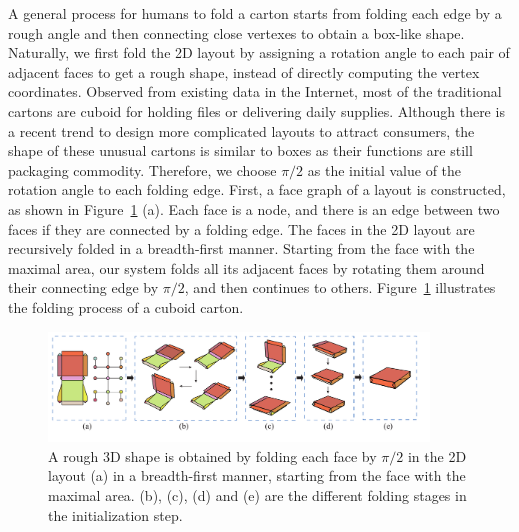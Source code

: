 


A general process for humans to fold a carton starts from folding each edge by a rough angle and then connecting close vertexes to obtain a box-like shape. 
Naturally, we first fold the 2D layout by assigning a rotation angle to each pair of adjacent faces to get a rough shape, instead of directly computing the vertex coordinates.
%	
Observed from existing data in the Internet, most of the traditional cartons are cuboid for holding files or delivering daily supplies. 
Although there is a recent trend to design more complicated layouts to attract consumers, the shape of these unusual cartons is similar to boxes as their functions are still packaging commodity. 
%
Therefore, we choose $\pi/2$ as the initial value of the rotation angle to each folding edge. 
%
First, a face graph of a layout is constructed, as shown in Figure~\ref{fig:midresult} (a).
Each face is a node, and there is an edge between two faces if they are connected by a folding edge.
%
The faces in the 2D layout are recursively folded in a breadth-first manner.
Starting from the face with the maximal area, our system folds all its adjacent faces by rotating them around their connecting edge by $\pi/2$, and then continues to others. 
Figure~\ref{fig:midresult} illustrates the folding process of a cuboid carton. 

\begin{figure}[ht]
	\centering
	\includegraphics[width=0.9\textwidth]{images/midresult}
	\caption{A rough 3D shape is obtained by folding each face by $\pi/2$ in the 2D layout (a) in a breadth-first manner, starting from the face with the maximal area. (b), (c), (d) and (e) are the different folding stages in the initialization step.}
	\label{fig:midresult}
\end{figure}


